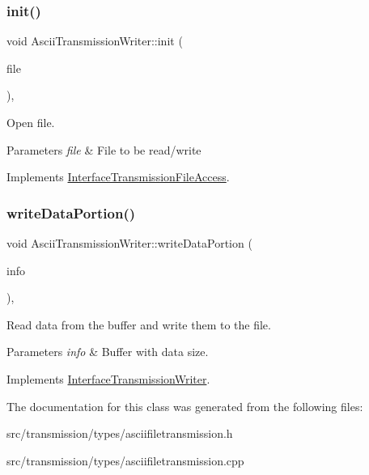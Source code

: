 \subsubsection{\texorpdfstring{init()}{init()}}
{\footnotesize\ttfamily void Ascii\+Transmission\+Writer\+::init (\begin{DoxyParamCaption}\item[{const Q\+File \&}]{file }\end{DoxyParamCaption})\hspace{0.3cm}{\ttfamily [override]}, {\ttfamily [virtual]}}



Open file. 


\begin{DoxyParams}{Parameters}
{\em file} & File to be read/write \\
\hline
\end{DoxyParams}


Implements \hyperlink{classInterfaceTransmissionFileAccess_a8c423ccb527b1dda62c798a75b6eb690}{Interface\+Transmission\+File\+Access}.

\mbox{\label{classAsciiTransmissionWriter_a49127d2b72eceeb35211d91601434a27}} 
\subsubsection{\texorpdfstring{write\+Data\+Portion()}{writeDataPortion()}}
{\footnotesize\ttfamily void Ascii\+Transmission\+Writer\+::write\+Data\+Portion (\begin{DoxyParamCaption}\item[{Buffer\+Info}]{info }\end{DoxyParamCaption})\hspace{0.3cm}{\ttfamily [override]}, {\ttfamily [virtual]}}



Read data from the buffer and write them to the file. 


\begin{DoxyParams}{Parameters}
{\em info} & Buffer with data size. \\
\hline
\end{DoxyParams}


Implements \hyperlink{classInterfaceTransmissionWriter_a024c3a22d937e659259f2eb242b3ea97}{Interface\+Transmission\+Writer}.



The documentation for this class was generated from the following files\+:\begin{DoxyCompactItemize}
\item 
src/transmission/types/asciifiletransmission.\+h\item 
src/transmission/types/asciifiletransmission.\+cpp\end{DoxyCompactItemize}
